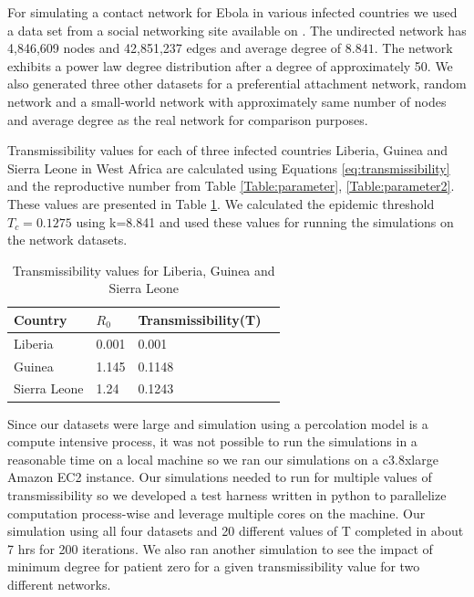 \documentclass[10pt, journal,onecolumn]{IEEEtran}
\begin{document}
For simulating a contact network for Ebola in various infected countries we used a data set from a
social networking site available on \citep{topcoderdata}. The undirected network has 4,846,609 nodes
and 42,851,237 edges and average degree of $8.841$. The network exhibits a power law degree
distribution after a degree of approximately 50. We also generated three other datasets  for a
preferential attachment network, random network and a small-world network with approximately same
number of nodes and average degree as the real network for comparison purposes.

Transmissibility values for each of three infected countries Liberia, Guinea and Sierra Leone in
West Africa are calculated using Equations \eqref{eq:transmissibility}  and the reproductive number
from Table \ref{Table:parameter}, \ref{Table:parameter2}. These values are presented in Table
\ref{tab:T}.  We calculated the epidemic threshold  $T_c=0.1275$  using k=8.841 and used these
values for  running the simulations on the  network datasets.

\begin{table}[h]
\caption{Transmissibility values for  Liberia, Guinea and Sierra Leone}
\begin{center}
    \begin{tabular}{ | l | l | l | p{5cm} |}
    \hline
    Country & $R_0$ & Transmissibility(T) \\ \hline
    \hline
    Liberia & 0.001 & 0.001  \\ \hline
    Guinea & 1.145 & 0.1148 \\ \hline
    Sierra Leone & 1.24 & 0.1243  \\ \hline
    \end{tabular}
\end{center}
\label{tab:T}
\end{table}
\label{Tb:Transmissibility}

Since our datasets were  large and simulation using a percolation model is a compute intensive
process, it was not possible to run the simulations in a reasonable time on a local machine so
we ran our simulations on a c3.8xlarge Amazon EC2 instance. Our simulations needed to run for
multiple values  of transmissibility so we developed a test harness written in python
to parallelize computation process-wise and leverage multiple cores on the machine.
Our simulation using  all
four datasets and 20 different values of T  completed in  about 7 hrs for 200 iterations. We also
ran another simulation to see the impact of minimum degree for patient zero for a given
transmissibility value for two different networks.
\end{document}
